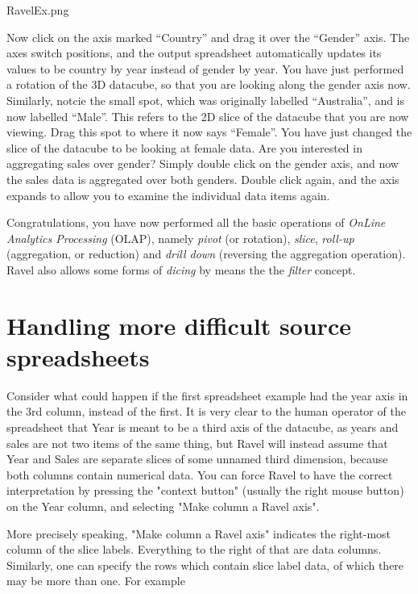 \documentclass{article}
\renewcommand{\htmladdimg}{\mbox{}}
\begin{document}
\begin{center}
\htmladdimg{RavelEx.png}
\end{center}

Now click on the axis marked ``Country'' and drag it over the
``Gender'' axis. The axes switch positions, and the output spreadsheet
automatically updates its values to be country by year instead of
gender by year. You have just performed a rotation of the 3D datacube,
so that you are looking along the gender axis now. Similarly, notcie
the small spot, which was originally labelled ``Australia'', and is
now labelled ``Male''. This refers to the 2D slice of the datacube
that you are now viewing. Drag this spot to where it now says
``Female''. You have just changed the slice of the datacube to be
looking at female data. Are you interested in aggregating sales over
gender? Simply double click on the gender axis, and now the sales data
is aggregated over both genders. Double click again, and the axis
expands to allow you to examine the individual data items again.

Congratulations, you have now performed all the basic operations of
{\em OnLine Analytics Processing} (OLAP), namely {\em pivot} (or
rotation), {\em slice}, {\em roll-up} (aggregation, or reduction) and
{\em drill down} (reversing the aggregation operation). Ravel also
allows some forms of {\em dicing} by means the the {\em filter}
concept.

\section{Handling more difficult source spreadsheets}\label{difficult}


Consider what could happen if the first spreadsheet example had the
year axis in the 3rd column, instead of the first. It is very clear to
the human operator of the spreadsheet that Year is meant to be a third
axis of the datacube, as years and sales are not two items of the same
thing, but Ravel will instead assume that Year and Sales are separate
slices of some unnamed third dimension, because both columns contain
numerical data. You can force Ravel to have the correct interpretation
by pressing the "context button" (usually the right mouse button) on
the Year column, and selecting "Make column a Ravel axis".

More precisely speaking, "Make column a Ravel axis" indicates the
right-most column of the slice labels. Everything to the right of that
are data columns. Similarly, one can specify the rows which contain
slice label data, of which there may be more than one. For example
\end{document}
